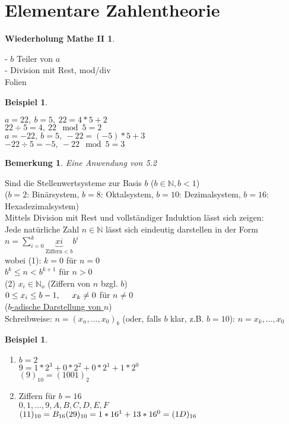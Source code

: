 \documentclass[a4paper,11pt]{article}
\newtheorem{bsp}[definition]{Beispiel}
\newtheorem{bem}[definition]{Bemerkung}
\newtheorem{wdh}[definition]{Wiederholung Mathe II}
\newcommand{\hsp}{\hspace{5mm}}
\begin{document}
\newpage

\section{Elementare Zahlentheorie}
\begin{wdh}
\end{wdh}
- $b$ Teiler von $a$ \\
- Division mit Rest, mod/div \\
Folien

\begin{bsp}
\end{bsp}
$a=22,\:b=5,\:22=4*5+2$ \\
$22\div5=4,\: 22\mod5=2$ \\
$a=-22,\:b=5,\:-22=(-5)*5+3$ \\
$-22\div5=-5,\:-22\mod5=3$

\begin{bem}
	Eine Anwendung von 5.2
\end{bem}
Sind die Stellenwertsysteme zur Basis $b$ ($b\in\mathbb{N},b<1$) \\
($b=2$: Binärsystem, $b=8$: Oktalsystem, $b=10$: Dezimalsystem, $b=16$: Hexadezimalsystem) \\
Mittels Division mit Rest und vollständiger Induktion lässt sich zeigen: \\
Jede natürliche Zahl $n\in\mathbb{N}$ lässt sich eindeutig darstellen in der Form $n=\sum_{i=0}^k\underbrace{xi}_{\text{Ziffern}<b}b^i$ \\
wobei (1): $k=0$ für $n=0$ \\
$b^k\leq n<b^{k+1}$ für $n>0$ \\
(2) $x_i\in\mathbb{N}_o$ (Ziffern von $n$ bzgl.  $b$) \\
$0\leq x_i\leq b-1,\hsp x_k\neq0$ für $n\neq0$ \\
(\underline{$b$-adische Darstellung von $n$}) \\
Schreibweise: $n=(x_n,...,x_0)_b$ (oder, falls $b$ klar, z.B. $b=10$): $n=x_k,...,x_0$

\begin{bsp}
\end{bsp}
\begin{enumerate}[label=\alph*)]
	\item $b=2$ \\
	$9=1*2^3+0*2^2+0*2^1+1*2^0$ \\
	$(9)_{10}=(1001)_2$
	\item Ziffern für $b=16$ \\
	$0,1,...,9,A,B,C,D,E,F$ \\
	$(11)_{10}=B_{16} \\
	(29)_{10}=1*16^1+13*16^0=(1D)_{16}$
\end{enumerate}
\end{document}
